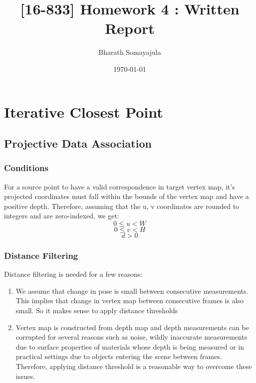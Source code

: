 \documentclass[12pt, a4paper]{article}
\title{[16-833] Homework 4 : Written Report}
\author{Bharath Somayajula}
\date{\today}
\begin{document}
\maketitle

\tableofcontents

\section{Iterative Closest Point}
\subsection{Projective Data Association}
\subsubsection{Conditions}
For a source point to have a valid correspondence in target vertex map, it's projected coordinates must fall within the bounds of the vertex map and have a positive depth. Therefore, assuming that the u, v coordinates are rounded to integers and are zero-indexed, we get:
\[0 \leq  u < W\]
\[0 \leq  v < H\]
\[d > 0\]

\subsubsection{Distance Filtering}
Distance filtering is needed for a few reasons:
\begin{enumerate}
  \item We assume that change in pose is small between consecutive measurements. This implies that change in vertex map between consecutive frames is also small. So it makes sense to apply distance thresholds
  \item Vertex map is constructed from depth map and depth measurements can be corrupted for several reasons such as noise, wildly inaccurate measurements due to surface properties of materials whose depth is being measured or in practical settings due to objects entering the scene between frames. Therefore, applying distance threshold is a reasonable way to overcome these issues.
\end{enumerate}
\end{document}
